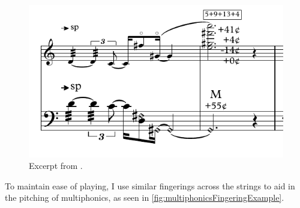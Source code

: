 \begin{figure}
  \centering
  \includegraphics{./resources/multiphonicsFingeringExample.pdf}
  \caption{Excerpt from \bassPiece.}\label{fig:multiphonicsFingeringExample}
\end{figure}
To maintain ease of playing, I use similar fingerings across the strings to aid in the pitching of multiphonics, as seen in \autoref{fig:multiphonicsFingeringExample}.





